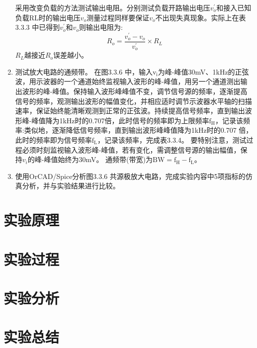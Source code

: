\documentclass[a4paper]{article}
\theoremstyle{definition}
\theoremstyle{plain}
\theoremstyle{remark}
\begin{document}
\begin{enumerate}
	      采用改变负载的方法测试输出电阻。分别测试负载开路输出电压$v^{'}_{o}$和接入已知负载RL时的输出电压$v_o$测量过程同样要保证$v_o$不出现失真现象。实际上在表3.3.3 中已得到$v^{'}_{o}$和$v_o$则输出电阻为:
	      \begin{equation}
		      R_o = \frac{v^{'}_{o}-v_o}{v^{'}_{o}}\times R_L
	      \end{equation}
	      $R_L$越接近$R_o$误差越小。

	\item 测试放大电路的通频带。
	      在图3.3.6 中，输入$\mathrm{v_i}$为峰-峰值30mV、1kHz的正弦波，用示波器的一个通道始终监视输入波形的峰-峰值，用另一个通道测出输出波形的峰-峰值。保持输入波形峰峰值不变，调节信号源的频率，逐渐提高信号的频率，观测输出波形的幅值变化，并相应适时调节示波器水平轴的扫描速率，保证始终能清晰观测到正常的正弦波。持续提高信号频率，直到输出波形峰-峰值降为1kHz时的0.707倍，此时信号的频率即为上限频率$\mathrm{f_H}$，记录该频率:类似地，逐渐降低信号频率，直到输出波形峰峰值降为1kHz时的0.707 倍，此时的频率即为信号频率$\mathrm{f_L}$，记录该频率，完成表3.3.4。 要特别注意，测试过程必须时刻监视输入波形峰-峰值，若有变化，需调整信号源的输出幅值，保持$v_i$的峰-峰值始终为30mV。
	      通频带(带宽)为$\mathrm{BW=f_H-f_L}$。
	\item 使用OrCAD/Spice分析图3.3.6 共源极放大电路，完成实验内容中5项指标的仿真分析，并与实验结果进行比较。


\end{enumerate}



\section{实验原理}

\section{实验过程}

\section{实验分析}

\section{实验总结}
\end{document}
